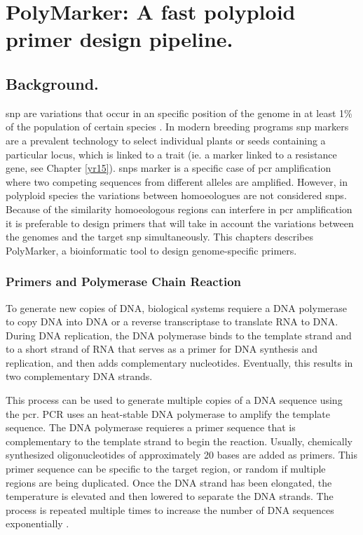 
\chapter{PolyMarker: A fast polyploid primer design pipeline.}
\glsresetall
\label{cha:polymarker}
\section{Background.}


\gls{snp} are variations that occur in an specific position of the genome in at least 1\% of the population of certain species \citep{Jehan2006}. 
In modern breeding programs \gls{snp} markers are a prevalent technology to select individual plants or seeds containing a particular locus, which is linked to a trait (ie. a marker linked to a resistance gene, see Chapter \ref{yr15}). 
\glspl{snp} marker is a specific case of \gls{pcr} amplification where two competing sequences from different alleles are amplified. 
However, in polyploid species the variations between homoeologues are not considered \glspl{snp}.
Because of the similarity homoeologous regions can interfere in \gls{pcr} amplification it is preferable to design primers that will take in account the variations between the genomes and the target \gls{snp} simultaneously. 
This chapters describes PolyMarker, a bioinformatic tool to design genome-specific primers. 


\subsection{Primers and Polymerase Chain Reaction}
To generate new copies of DNA, biological systems requiere a DNA polymerase to copy DNA into DNA or a reverse transcriptase to translate RNA to DNA. During DNA replication, the DNA polymerase binds to the template strand and to a short strand of RNA that serves as a primer for DNA synthesis and replication, and then adds complementary nucleotides. Eventually, this results in two complementary DNA strands\cite{alberts2014molecular}.

This process can be used to generate multiple copies of a DNA sequence using the \gls{pcr}. PCR uses an heat-stable DNA polymerase to amplify the template sequence. The DNA polymerase requieres a primer sequence that is complementary to the template strand to begin the reaction. Usually, chemically synthesized oligonucleotides of approximately 20 bases are added as primers. This primer sequence can be specific to the target region, or random if multiple regions are being duplicated. Once the DNA strand has been elongated, the temperature is elevated and then lowered to separate the DNA strands. The process is repeated multiple times to increase the number of DNA sequences exponentially \cite{alberts2014molecular}.

